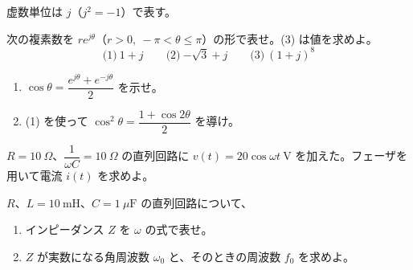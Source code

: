 \documentclass[11pt]{article}
\begin{document}
{\small 虚数単位は $j$（$j^2=-1$）で表す。}

\problem[極形式]
次の複素数を $re^{j\theta}$（$r>0,\ -\pi<\theta\le\pi$）の形で表せ。(3) は値を求めよ。
\[ \text{(1)}\ 1+j \qquad \text{(2)}\ {-\sqrt3} + j \qquad \text{(3)}\ (1+j)^8 \]
\workspace{45mm}

\problem[オイラーの公式の応用]
\begin{enumerate}[label=(\arabic*)]
\item $\cos\theta = \dfrac{e^{j\theta} + e^{-j\theta}}{2}$ を示せ。
\item (1) を使って $\cos^2\theta = \dfrac{1 + \cos 2\theta}{2}$ を導け。
\end{enumerate}
\workspace{50mm}

\problem[RC直列回路]
$R = 10\ \Omega$、$\dfrac{1}{\omega C} = 10\ \Omega$ の直列回路に $v(t) = 20\cos\omega t\ \mathrm{V}$ を加えた。フェーザを用いて電流 $i(t)$ を求めよ。
\workspace{55mm}

\problem[直列共振]
$R$、$L = 10\ \mathrm{mH}$、$C = 1\ \mu\mathrm{F}$ の直列回路について、
\begin{enumerate}[label=(\arabic*)]
\item インピーダンス $Z$ を $\omega$ の式で表せ。
\item $Z$ が実数になる角周波数 $\omega_0$ と、そのときの周波数 $f_0$ を求めよ。
\end{enumerate}
\workspace{40mm}
\end{document}
